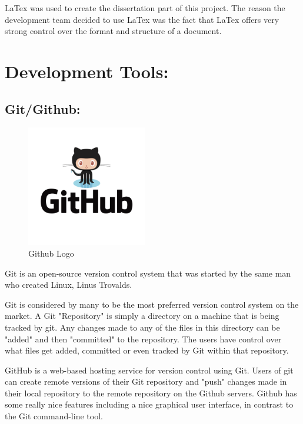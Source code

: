 \bigskip

LaTex was used to create the dissertation part of this project. The reason the development team decided to use LaTex was the fact that LaTex offers very strong control over the format and structure of a document. 

\section{Development Tools:}
\label{sec:TechnologyReviewDevTools}
\subsection{Git/Github:}
\label{sec:TechnologyReviewGithub}

\begin{figure}[H]
    \centering
    \includegraphics[width=\textwidth, height=150pt]{img/GitHubLogo.PNG}
    \caption{Github Logo}
    \label{fig:my_label}
\end{figure}

\bigskip

Git is an open-source version control system that was started by the same man who created Linux, Linus Trovalds.

Git is considered by many to be the most preferred version control system on the market. A Git "Repository" is simply a directory on a machine that is being tracked by git. Any changes made to any of the files in this directory can be "added" and then "committed" to the repository. The users have control over what files get added, committed or even tracked by Git within that repository. 

\bigskip

GitHub is a web-based hosting service for version control using Git. Users of git can create remote versions of their Git repository and "push" changes made in their local repository to the remote repository on the Github servers.  Github has some really nice features including a nice graphical user interface, in contrast to the Git command-line tool. 

